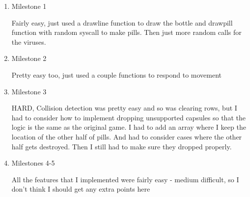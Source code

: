 \documentclass{article}
\begin{document}

\begin{enumerate}
    \item Milestone 1
    
    Fairly easy, just used a drawline function to draw the bottle and drawpill function with random syscall to make pills. Then just more random calls for the viruses.
    \item Milestone 2
    
    Pretty easy too, just used a couple functions to respond to movement
    \item Milestone 3
    
    HARD, Collision detection was pretty easy and so was clearing rows,
    but I had to consider how to implement dropping unsupported capsules so that the logic is the same as the original game. I had to add an array where I keep the location of the other half of pills. And had to consider cases where the other half gets destroyed. Then I still had to make sure they dropped properly.
    
    \item Milestones 4-5
    
    All the features that I implemented were fairly easy - medium difficult, so I don't think I should get any extra points here
\end{enumerate}
\end{document}
